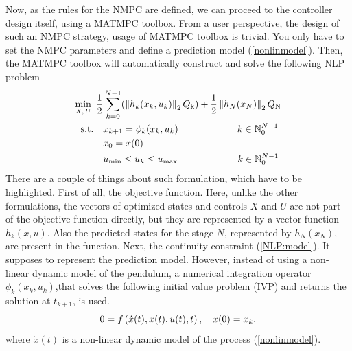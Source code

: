 Now, as the rules for the NMPC are defined, we can proceed to the controller design itself, using a \textsc{MATMPC} toolbox. From a user perspective, the design of such an NMPC strategy, usage of \textsc{MATMPC} toolbox is trivial. You only have to set the NMPC parameters and define a prediction model (\ref{nonlinmodel}). Then, the \textsc{MATMPC} toolbox will automatically construct and solve the following NLP problem
\begin{subequations}\label{NLP}
	\begin{align}
	\min_{X,\,U}\ \frac{1}{2}&\sum_{k=0}^{N-1} (\left\| h_k(x_k, u_k)\right\|_2Q _{\text{k}}) + \frac{1}{2}\left\|h_N(x_N)\right\|_2Q _{\text{N}}\label{NLP:obj}\\
	\text{s.t.}\quad &x_{k+1} = \phi_k(x_{k},u_{k})\qquad\qquad\qquad\, k \in \mathbb{N}_0^{N-1}\label{NLP:model}\\
	&x_0 = x(0)\\
	&u _{\text{min}}\leq u_{k}\leq u _{\text{max}}\qquad\qquad\qquad\;   k \in \mathbb{N}_0^{N-1}	
	\end{align}
\end{subequations}
There are a couple of things about such formulation, which have to be highlighted. First of all, the objective function. Here, unlike the other formulations, the vectors of optimized states and controls $X$ and $U$ are not part of the objective function directly, but they are represented by a vector function $h_k(x, u)$. Also the predicted states for the stage $N$, represented by $h_N(x_N)$, are present in the function. Next, the continuity constraint (\ref{NLP:model}). It supposes to represent the prediction model. However, instead of using a non-linear dynamic model of the pendulum,  a numerical integration operator $\phi_k(x_{k},u_{k})$,that solves the following initial value problem (IVP) and returns the solution at $t_{k+1}$, is used. 
\begin{equation}
0=f\left( \dot{x}(t), x(t),u(t),t \right),\quad x(0)=x_k.
\end{equation}
where $\dot{x}(t)$ is a non-linear dynamic model of the process (\ref{nonlinmodel}).

